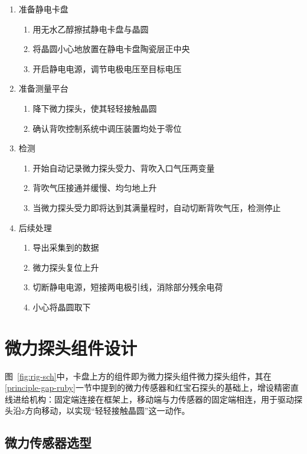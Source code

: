 \begin{enumerate}
  \item 准备静电卡盘
  \begin{enumerate}
    \item 用无水乙醇擦拭静电卡盘与晶圆
    \item 将晶圆小心地放置在静电卡盘陶瓷层正中央
    \item 开启静电电源，调节电极电压至目标电压
  \end{enumerate}
  
  \item 准备测量平台
  \begin{enumerate}
    \item 降下微力探头，使其轻轻接触晶圆
    \item 确认背吹控制系统中调压装置均处于零位
  \end{enumerate}
  
  \item 检测
  \begin{enumerate}
    \item 开始自动记录微力探头受力、背吹入口气压两变量
    \item 背吹气压接通并缓慢、均匀地上升
    \item 当微力探头受力即将达到其满量程时，自动切断背吹气压，检测停止
  \end{enumerate}
  
  \item 后续处理
  \begin{enumerate}
    \item 导出采集到的数据
    \item 微力探头复位上升
    \item 切断静电电源，短接两电极引线，消除部分残余电荷
    \item 小心将晶圆取下
  \end{enumerate}
\end{enumerate}



\section{微力探头组件设计}\label{sec:rig-probe}

图~\ref{fig:rig-sch}中，卡盘上方的组件即为微力探头组件微力探头组件，其在\ref{principle-gap-ruby}一节中提到的微力传感器和红宝石探头的基础上，增设精密直线进给机构：固定端连接在框架上，移动端与力传感器的固定端相连，用于驱动探头沿z方向移动，以实现“轻轻接触晶圆”这一动作。


\subsection{微力传感器选型}\label{sec:rig-probe-sensor}

